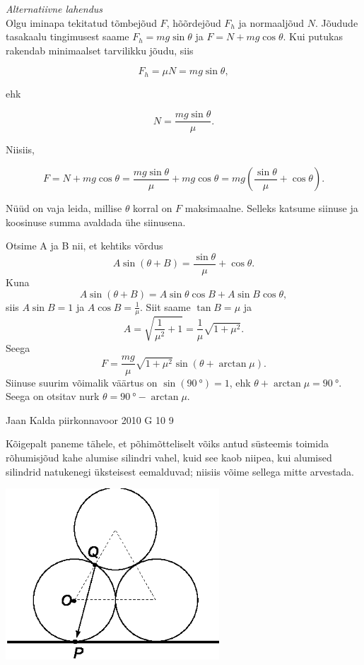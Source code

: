 \documentclass[11pt]{article}
\begin{document}
{{\vspace{0.5\baselineskip}

{\em Alternatiivne lahendus}\\ 
Olgu iminapa tekitatud tõmbejõud $F$, hõõrdejõud $F_h$ ja normaaljõud $N$. Jõudude tasakaalu tingimusest saame
$F_{h}=mg\sin\theta$ ja $F=N+mg\cos\theta$. Kui putukas rakendab minimaalset tarvilikku jõudu, siis 

$$F_{h}=\mu N=mg\sin\theta,$$

ehk

$$N=\frac{mg\sin\theta}{\mu}.$$

Niisiis,

$$F=N+mg\cos\theta=\frac{mg\sin\theta}{\mu}+mg\cos\theta=mg\left( \frac{\sin\theta}{\mu}+\cos\theta\right).$$

Nüüd on vaja leida, millise $\theta$ korral on $F$ maksimaalne. Selleks katsume siinuse ja koosinuse summa avaldada ühe siinusena. 

Otsime A ja B nii, et kehtiks võrdus 
\[
A\sin (\theta+B)=\frac{\sin\theta}{\mu}+\cos\theta.
\]
Kuna 
\[
A\sin (\theta+B)=A\sin\theta\cos B + A\sin B \cos\theta,
\]
siis 
$A\sin B=1$ ja $A\cos B=\frac{1}{\mu}$. Siit saame $\tan B=\mu$ ja 
\[
A=\sqrt{\frac{1}{{\mu}^2} + 1}=\frac{1}{\mu}\sqrt{1+{\mu}^2}.
\]
Seega 
\[
F=\frac{mg}{\mu}\sqrt{1+{\mu}^2}\sin(\theta + \arctan\mu).
\]
Siinuse suurim võimalik väärtus on $\sin(\SI{90}{\degree})=1$, ehk $\theta + \arctan\mu=\SI{90}{\degree}$. Seega on otsitav nurk $\theta = \SI{90}{\degree}-\arctan\mu$.
\fi
}

{Jaan Kalda} %
{piirkonnavoor} %
{2010} %
{G 10} %
{9} %
{

\ifSolution
Kõigepalt paneme tähele, et põhimõtteliselt võiks antud süsteemis toimida rõhumisjõud kahe alumise silindri vahel, kuid see
kaob niipea, kui alumised silindrid natukenegi üksteisest eemalduvad; niisiis võime sellega mitte arvestada.

\begin{center}
	\includegraphics[width=0.6\textwidth]{2010-v2g-10-torudlah.eps}
\end{center}

}}
\end{document}
